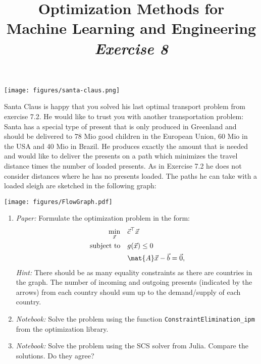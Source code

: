 



\author{}
\date{}
\title{Optimization Methods for \\Machine Learning and Engineering\\\vspace{0.5cm}\textit{Exercise 8}}
\maketitle


\setcounter{section}{8}
\setcounter{exercise}{0}

%

\begin{exercise}[subtitle={Paper + Notebook}]
\begin{center}
\texttt{[image: figures/santa-claus.png]}
\end{center}

Santa Claus is happy that you solved his last optimal transport problem from exercise 7.2. He would like to trust you with another transportation problem: Santa has a special type of present that is only produced in Greenland and should be delivered to 78 Mio good children in the European Union, 60 Mio in the USA and 40 Mio in Brazil. He produces exactly the amount that is needed and would like to deliver the presents on a path which minimizes the travel distance times the number of loaded presents. As in Exercise 7.2 he does not consider distances where he has no presents loaded. The paths he can take with a loaded sleigh are sketched in the following graph:
\begin{center}
\texttt{[image: figures/FlowGraph.pdf]}
\end{center}

\begin{enumerate}[label=\emph{\alph*)}]
\item \textit{Paper:} Formulate the optimization problem in the form:
\begin{align*}
\min_{\vec{x}} \quad & \vec{c}^\top \vec{x}\\
\text{subject to} \quad & g(\vec{x}) \leq 0\\
& \mat{A}\vec{x} - \vec{b} = \vec{0},
\end{align*}
\textit{Hint:} There should be as many equality constraints as there are countries in the graph. The number of incoming and outgoing presents (indicated by the arrows) from each country should sum up to the demand/supply of each country.
\item \textit{Notebook:} Solve the problem using the function \texttt{ConstraintElimination\_ipm} from the optimization library.
\item \textit{Notebook:} Solve the problem using the SCS solver from Julia. Compare the solutions. Do they agree?
\end{enumerate}

\end{exercise}


